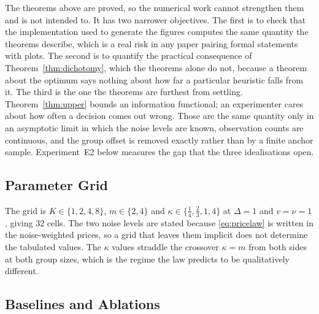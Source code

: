 The theorems above are proved, so the numerical work cannot strengthen them and is not
intended to. It has two narrower objectives. The first is to check that the implementation
used to generate the figures computes the same quantity the theorems describe, which is a
real risk in any paper pairing formal statements with plots. The second is to quantify the
practical consequence of Theorem~\ref{thm:dichotomy}, which the theorems alone do not,
because a theorem about the optimum says nothing about how far a particular heuristic falls
from it. The third is the one the theorems are furthest from settling. Theorem~\ref{thm:upper}
bounds an information functional; an experimenter cares about how often a decision comes out
wrong. Those are the same quantity only in an asymptotic limit in which the noise levels are
known, observation counts are continuous, and the group offset is removed exactly rather than
by a finite anchor sample. Experiment~E2 below measures the gap that the three idealisations
open.

\subsection{Parameter Grid}

The grid is $K\in\{1,2,4,8\}$, $m\in\{2,4\}$ and
$\kappa\in\{\tfrac14,\tfrac23,1,4\}$ at $\Delta=1$ and $v=\nu=1$, giving $32$ cells. The
two noise levels are stated because \eqref{eq:pricelaw} is written in the noise-weighted
prices, so a grid that leaves them implicit does not determine the tabulated values. The $\kappa$ values
straddle the crossover $\kappa=m$ from both sides at both group sizes, which is the regime
the law predicts to be qualitatively different.

\subsection{Baselines and Ablations}

